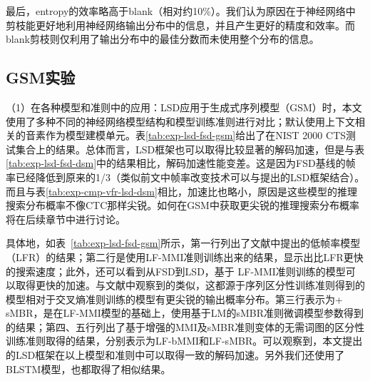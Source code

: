 最后，entropy的效率略高于blank（相对约10\%）。我们认为原因在于神经网络中剪枝能更好地利用神经网络输出分布中的信息，并且产生更好的精度和效率。而blank剪枝则仅利用了输出分布中的最佳分数而未使用整个分布的信息。

\subsection{GSM实验}
\label{exp:gsm}
（1）在各种模型和准则中的应用：LSD应用于生成式序列模型（GSM）时，本文使用了多种不同的神经网络模型结构和模型训练准则进行对比；默认使用上下文相关的音素作为模型建模单元。表\ref{tab:exp-lsd-fsd-gsm}给出了在NIST 2000 CTS测试集合上的结果。总体而言，LSD框架也可以取得比较显著的解码加速，但是与表\ref{tab:exp-lsd-fsd-dsm}中的结果相比，解码加速性能变差。这是因为FSD基线的帧率已经降低到原来的1/3\cite{pundak2016lower}（类似前文中帧率改变技术可以与提出的LSD框架结合）。而且与表\ref{tab:exp-cmp-vfr-lsd-dsm}相比，加速比也略小，原因是这些模型的推理搜索分布概率不像CTC那样尖锐。如何在GSM中获取更尖锐的推理搜索分布概率将在后续章节中进行讨论。

具体地，如表~\ref{tab:exp-lsd-fsd-gsm}所示，第一行列出了文献\cite{pundak2016lower}中提出的低帧率模型（LFR）的结果；第二行是使用LF-MMI准则\cite{povey2016purely}训练出来的结果，显示出比LFR更快的搜索速度；此外，还可以看到从FSD到LSD，基于 LF-MMI准则训练的模型可以取得更快的加速。与文献\cite{paulik2015improvements}中观察到的类似，这都源于序列区分性训练准则得到的模型相对于交叉熵准则训练的模型有更尖锐的输出概率分布。第三行表示为+ sMBR，是在LF-MMI模型的基础上，使用基于LM的sMBR准则微调模型参数得到的结果；第四、五行列出了基于增强的MMI\cite{povey2008boosted}及sMBR准则变体的无需词图的区分性训练准则取得的结果，分别表示为LF-bMMI和LF-sMBR。可以观察到，本文提出的LSD框架在以上模型和准则中可以取得一致的解码加速。另外我们还使用了BLSTM模型，也都取得了相似结果。


